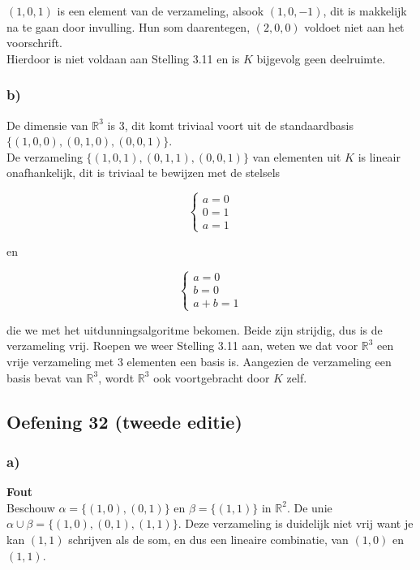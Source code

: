 \documentclass[lineaire_algebra_oplossingen.tex]{subfiles}
\begin{document}
$(1,0,1)$ is een element van de verzameling, alsook $(1,0,-1)$, dit is makkelijk na te gaan door invulling. Hun som daarentegen, $(2,0,0)$ voldoet niet aan het voorschrift.\\

Hierdoor is niet voldaan aan Stelling 3.11 en is $K$ bijgevolg geen deelruimte.

\subsubsection*{b)}

De dimensie van $\mathbb{R}^3$ is 3, dit komt triviaal voort uit de standaardbasis $\{(1,0,0),(0,1,0),(0,0,1)\}$.\\

De verzameling $\{(1,0,1),(0,1,1),(0,0,1)\}$ van elementen uit $K$ is lineair onafhankelijk, dit is triviaal te bewijzen met de stelsels

\[
\left\{
\begin{array}{l}
a = 0\\
0 = 1\\
a = 1
\end{array} \right.
\]

en

\[
\left\{
\begin{array}{l}
a = 0\\
b = 0\\
a + b = 1
\end{array} \right.
\]

die we met het uitdunningsalgoritme bekomen. Beide zijn strijdig, dus is de verzameling vrij. Roepen we weer Stelling 3.11 aan, weten we dat voor $\mathbb{R}^3$ een vrije verzameling met 3 elementen een basis is. Aangezien de verzameling een basis bevat van $\mathbb{R}^3$, wordt $\mathbb{R}^3$ ook voortgebracht door $K$ zelf.
\subsection{Oefening 32 (tweede editie)}
\subsubsection*{a)}
\textbf{Fout}\\
Beschouw $\alpha = \{(1,0),(0,1)\}$ en $\beta=\{(1,1)\}$ in $\mathbb{R}^2$. De unie $\alpha \cup \beta = \{(1,0),(0,1), (1,1)\}$. Deze verzameling is duidelijk niet vrij want je kan $(1,1)$ schrijven als de som, en dus een lineaire combinatie, van $(1,0)$ en $(1,1)$.
\end{document}
